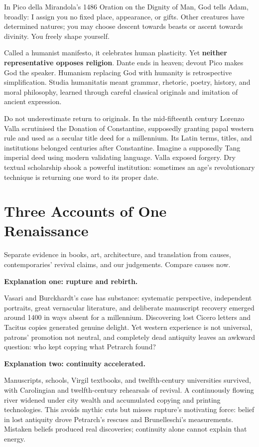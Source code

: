 In Pico della Mirandola's 1486 Oration on the Dignity of Man, God tells Adam, broadly: I assign you no fixed place, appearance, or gifts. Other creatures have determined natures; you may choose descent towards beasts or ascent towards divinity. You freely shape yourself.

Called a humanist manifesto, it celebrates human plasticity. Yet \textbf{neither representative opposes religion}. Dante ends in heaven; devout Pico makes God the speaker. Humanism replacing God with humanity is retrospective simplification. Studia humanitatis meant grammar, rhetoric, poetry, history, and moral philosophy, learned through careful classical originals and imitation of ancient expression.

Do not underestimate return to originals. In the mid-fifteenth century Lorenzo Valla scrutinised the Donation of Constantine, supposedly granting papal western rule and used as a secular title deed for a millennium. Its Latin terms, titles, and institutions belonged centuries after Constantine. Imagine a supposedly Tang imperial deed using modern validating language. Valla exposed forgery. Dry textual scholarship shook a powerful institution: sometimes an age's revolutionary technique is returning one word to its proper date.

\section{Three Accounts of One Renaissance}
Separate evidence in books, art, architecture, and translation from causes, contemporaries' revival claims, and our judgements. Compare causes now.

\textbf{Explanation one: rupture and rebirth.}

Vasari and Burckhardt's case has substance: systematic perspective, independent portraits, great vernacular literature, and deliberate manuscript recovery emerged around 1400 in ways absent for a millennium. Discovering lost Cicero letters and Tacitus copies generated genuine delight. Yet western experience is not universal, patrons' promotion not neutral, and completely dead antiquity leaves an awkward question: who kept copying what Petrarch found?

\textbf{Explanation two: continuity accelerated.}

Manuscripts, schools, Virgil textbooks, and twelfth-century universities survived, with Carolingian and twelfth-century rehearsals of revival. A continuously flowing river widened under city wealth and accumulated copying and printing technologies. This avoids mythic cuts but misses rupture's motivating force: belief in lost antiquity drove Petrarch's rescues and Brunelleschi's measurements. Mistaken beliefs produced real discoveries; continuity alone cannot explain that energy.

